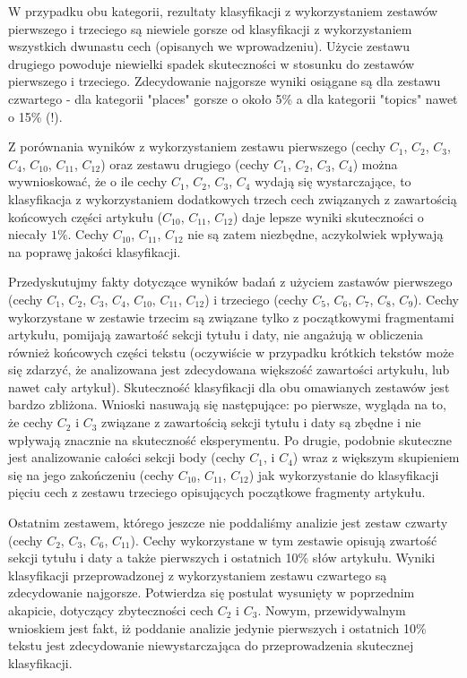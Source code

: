 \documentclass{classrep}
\begin{document}
W przypadku obu kategorii, rezultaty klasyfikacji z wykorzystaniem zestawów pierwszego i trzeciego są niewiele gorsze od klasyfikacji z wykorzystaniem wszystkich dwunastu cech (opisanych we wprowadzeniu). Użycie zestawu drugiego powoduje niewielki spadek skuteczności w stosunku do zestawów pierwszego i trzeciego. Zdecydowanie najgorsze wyniki osiągane są dla zestawu czwartego - dla kategorii "places" gorsze o około 5\% a dla kategorii "topics" nawet o 15\% (!). \newline

Z porównania wyników z wykorzystaniem zestawu pierwszego (cechy $C_{1}$,  $C_{2}$,  $C_{3}$,  $C_{4}$,  $C_{10}$,  $C_{11}$,  $C_{12}$) oraz zestawu drugiego (cechy $C_{1}$,  $C_{2}$,  $C_{3}$,  $C_{4}$) można wywnioskować, że o ile cechy $C_{1}$,  $C_{2}$,  $C_{3}$,  $C_{4}$ wydają się wystarczające, to klasyfikacja z wykorzystaniem dodatkowych trzech cech związanych z zawartością końcowych części artykułu ($C_{10}$,  $C_{11}$,  $C_{12}$) daje lepsze wyniki skuteczności o niecały $1\%$. Cechy $C_{10}$,  $C_{11}$,  $C_{12}$ nie są zatem niezbędne, aczykolwiek wpływają na poprawę jakości klasyfikacji.\newline

Przedyskutujmy fakty dotyczące wyników badań z użyciem zastawów pierwszego (cechy $C_{1}$,  $C_{2}$,  $C_{3}$,  $C_{4}$,  $C_{10}$,  $C_{11}$,  $C_{12}$) i trzeciego (cechy $C_{5}$,  $C_{6}$,  $C_{7}$,  $C_{8}$,  $C_{9}$). Cechy wykorzystane w zestawie trzecim są związane tylko z początkowymi fragmentami artykułu, pomijają zawartość sekcji tytułu i daty, nie angażują w obliczenia również końcowych części tekstu (oczywiście w przypadku krótkich tekstów może się zdarzyć, że analizowana jest zdecydowana większość zawartości artykułu, lub nawet cały artykuł). Skuteczność klasyfikacji dla obu omawianych zestawów jest bardzo zbliżona. Wnioski nasuwają się następujące: po pierwsze, wygląda na to, że cechy $C_{2}$ i $C_{3}$ związane z zawartością sekcji tytułu i daty są zbędne i nie wpływają znacznie na skuteczność eksperymentu. Po drugie, podobnie skuteczne jest analizowanie całości sekcji body (cechy  $C_{1}$, i $C_{4}$) wraz z większym skupieniem się na jego zakończeniu (cechy $C_{10}$,  $C_{11}$,  $C_{12}$) jak wykorzystanie do klasyfikacji pięciu cech z zestawu trzeciego opisujących początkowe fragmenty artykułu. \newline

Ostatnim zestawem, którego jeszcze nie poddaliśmy analizie jest zestaw czwarty (cechy $C_{2}$,  $C_{3}$,  $C_{6}$,  $C_{11}$). Cechy wykorzystane w tym zestawie opisują zwartość sekcji tytułu i daty a także pierwszych i ostatnich 10\% słów artykułu. Wyniki klasyfikacji przeprowadzonej z wykorzystaniem zestawu czwartego są zdecydowanie najgorsze. Potwierdza się postulat wysunięty w poprzednim akapicie, dotyczący zbyteczności cech $C_{2}$ i $C_{3}$. Nowym, przewidywalnym wnioskiem jest fakt, iż poddanie analizie jedynie pierwszych i ostatnich 10\% tekstu jest zdecydowanie niewystarczająca do przeprowadzenia skutecznej klasyfikacji.
\end{document}
